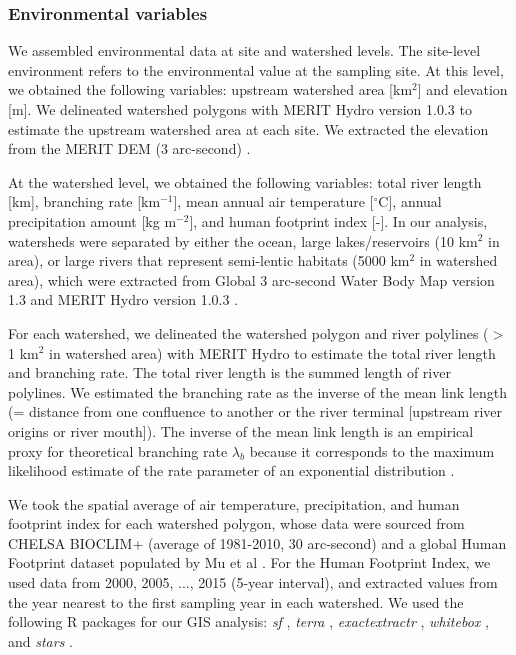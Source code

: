 \documentclass[11pt, class=article, crop=false]{standalone}
\begin{document}
\subsubsection{Environmental variables}

We assembled environmental data at site and watershed levels.
The site-level environment refers to the environmental value at the sampling site.
At this level, we obtained the following variables: upstream watershed area [km$^2$] and elevation [m].
We delineated watershed polygons with MERIT Hydro version 1.0.3 \citep{yamazaki_merit_2019} to estimate the upstream watershed area at each site.
We extracted the elevation from the MERIT DEM (3 arc-second) \citep{yamazaki_high-accuracy_2017}.

At the watershed level, we obtained the following variables: total river length [km], branching rate [km$^{-1}$], mean annual air temperature [$^\circ$C], annual precipitation amount [kg m$^{-2}$], and human footprint index [-].
In our analysis, watersheds were separated by either the ocean, large lakes/reservoirs (10 km$^{2}$ in area), or large rivers that represent semi-lentic habitats (5000 km$^{2}$ in watershed area), which were extracted from Global 3 arc-second Water Body Map version 1.3 \citep{yamazaki_development_2015} and MERIT Hydro version 1.0.3 \citep{yamazaki_merit_2019}.

For each watershed, we delineated the watershed polygon and river polylines ($>$ 1 km$^2$ in watershed area) with MERIT Hydro to estimate the total river length and branching rate.
The total river length is the summed length of river polylines.
We estimated the branching rate as the inverse of the mean link length (= distance from one confluence to another or the river terminal [upstream river origins or river mouth]).
The inverse of the mean link length is an empirical proxy for theoretical branching rate $\lambda_b$ because it corresponds to the maximum likelihood estimate of the rate parameter of an exponential distribution \citep{terui_revisiting_2024}.

We took the spatial average of air temperature, precipitation, and human footprint index for each watershed polygon, whose data were sourced from CHELSA BIOCLIM+ (average of 1981-2010, 30 arc-second) \citep{brun_global_2022} and a global Human Footprint dataset populated by Mu et al \citep{mu_global_2022}.
For the Human Footprint Index, we used data from 2000, 2005, ..., 2015 (5-year interval), and extracted values from the year nearest to the first sampling year in each watershed.
We used the following R packages for our GIS analysis: \textit{sf} \citep{pkg_sf}, \textit{terra} \citep{pkg_terra}, \textit{exactextractr} \citep{pkg_exactextractr}, \textit{whitebox} \citep{pkg_whitebox}, and \textit{stars} \citep{pkg_stars}.
\end{document}
